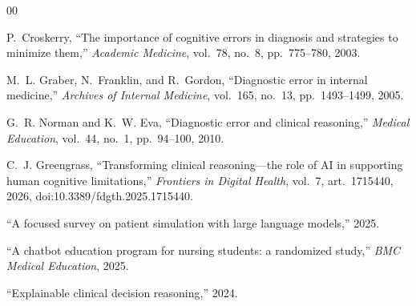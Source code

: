 \documentclass[conference]{IEEEtran}
\begin{document}
\begin{thebibliography}{00}

P.~Croskerry, ``The importance of cognitive errors in diagnosis and strategies
to minimize them,'' \emph{Academic Medicine}, vol.~78, no.~8, pp.~775--780, 2003.

M.~L. Graber, N.~Franklin, and R.~Gordon, ``Diagnostic error in internal
medicine,'' \emph{Archives of Internal Medicine}, vol.~165, no.~13,
pp.~1493--1499, 2005.

G.~R. Norman and K.~W. Eva, ``Diagnostic error and clinical reasoning,''
\emph{Medical Education}, vol.~44, no.~1, pp.~94--100, 2010.

C.~J. Greengrass, ``Transforming clinical reasoning---the role of AI in
supporting human cognitive limitations,'' \emph{Frontiers in Digital Health},
vol.~7, art.~1715440, 2026, doi:10.3389/fdgth.2025.1715440.

``A focused survey on patient simulation with large language models,'' 2025.

``A chatbot education program for nursing students: a randomized study,''
\emph{BMC Medical Education}, 2025.

``Explainable clinical decision reasoning,'' 2024.

\end{thebibliography}
\end{document}
